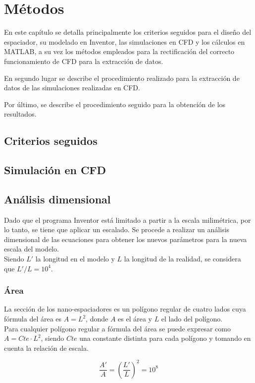\chapter{Métodos}
En este capítulo se detalla principalmente los criterios seguidos para el diseño del espaciador, su modelado en Inventor, las simulaciones en CFD y los cálculos en MATLAB, a su vez los métodos empleados para la rectificación del correcto funcionamiento de CFD para la extracción de datos.

En segundo lugar se describe el procedimiento realizado para la extracción de datos de las simulaciones realizadas en CFD.

Por último, se describe el procedimiento seguido para la obtención de los resultados.
\section{Criterios seguidos} 

\section{Simulación en CFD}


\section{Análisis dimensional}
Dado que el programa Inventor está limitado a partir a la escala milimétrica, por lo tanto, se tiene que aplicar un escalado. Se procede a realizar un análisis dimensional de las ecuaciones para obtener los nuevos parámetros para la nueva escala del modelo.\\

Siendo $L'$ la longitud en el modelo y $L$ la longitud de la realidad, se considera que ${L'}/{L}=10^4$.
\subsection{Área}
La sección de los nano-espaciadores es un polígono regular de cuatro lados cuya fórmula del área es $A=L^2$, donde $A$ es el área y $L$ el lado del polígono.\\

Para cualquier polígono regular a fórmula del área se puede expresar como $A=Cte\cdot L^2$, siendo $Cte$ una constante distinta para cada polígono y tomando en cuenta la relación de escala.

\begin{equation}
	\dfrac{A'}{A}=\left(\dfrac{L'}{L}\right)^2=10^8
\end{equation}
